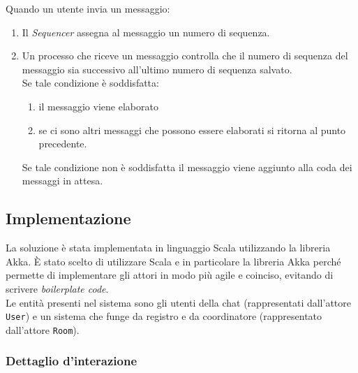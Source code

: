 \documentclass[a4paper]{report}
\begin{document}
Quando un utente invia un messaggio:
\begin{enumerate}
    \item Il \textit{Sequencer} assegna al messaggio un numero di sequenza.
    \item Un processo che riceve un messaggio controlla che il numero di sequenza del messaggio sia successivo all'ultimo numero di sequenza salvato.\\
    Se tale condizione è soddisfatta:
    \begin{enumerate}
        \item il messaggio viene elaborato
        \item se ci sono altri messaggi che possono essere elaborati si ritorna al punto precedente.
    \end{enumerate}
    Se tale condizione non è soddisfatta il messaggio viene aggiunto alla coda dei messaggi in attesa.
\end{enumerate}

\subsection{Implementazione}\label{implementazione-2}

La soluzione è stata implementata in linguaggio Scala utilizzando la libreria Akka. \`E stato scelto di utilizzare Scala e in particolare la libreria Akka perché permette di implementare gli attori in modo più agile e coinciso, evitando di scrivere \textit{boilerplate code}.\\
Le entità presenti nel sistema sono gli utenti della chat (rappresentati dall'attore \texttt{User}) e un sistema che funge da registro e da coordinatore (rappresentato dall'attore \texttt{Room}).

\subsubsection{Dettaglio d'interazione}
\end{document}
